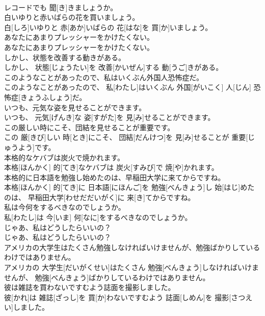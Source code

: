 \documentclass[8pt]{extreport}
\begin{document}
\begin{CJK}{UTF8}{min}
\\	レコードでも 聞[き]きましょうか。	
\\	白いゆりと赤いばらの花を買いましょう。	
\\	白[しろ]いゆりと 赤[あか]いばらの 花[はな]を 買[か]いましょう。	
\\	あなたにあまりプレッシャーをかけたくない。	
\\	あなたにあまりプレッシャーをかけたくない。	
\\	しかし、状態を改善する動きがある。	
\\	しかし、 状態[じょうたい]を 改善[かいぜん]する 動[うご]きがある。	
\\	このようなことがあったので、私はいくぶん外国人恐怖症だ。	
\\	このようなことがあったので、 私[わたし]はいくぶん 外国[がいこく] 人[じん] 恐怖症[きょうふしょう]だ。	
\\	いつも、元気な姿を見せることができます。	
\\	いつも、 元気[げんき]な 姿[すがた]を 見[み]せることができます。	
\\	この厳しい時にこそ、団結を見せることが重要です。	
\\	この 厳[きび]しい 時[とき]にこそ、 団結[だんけつ]を 見[み]せることが 重要[じゅうよう]です。	
\\	本格的なケバブは炭火で焼かれます。	
\\	本格[ほんかく] 的[てき]なケバブは 炭火[すみび]で 焼[や]かれます。	
\\	本格的に日本語を勉強し始めたのは、早稲田大学に来てからですね。	
\\	本格[ほんかく] 的[てき]に 日本語[にほんご]を 勉強[べんきょう]し 始[はじ]めたのは、 早稲田大学[わせだだいがく]に 来[き]てからですね。	
\\	私は今何をするべきなのでしょうか。	
\\	私[わたし]は 今[いま] 何[なに]をするべきなのでしょうか。	
\\	じゃあ、私はどうしたらいいの？	
\\	じゃあ、私はどうしたらいいの？	
\\	アメリカの大学生はたくさん勉強しなければいけませんが、勉強ばかりしているわけではありません。	
\\	アメリカの 大学生[だいがくせい]はたくさん 勉強[べんきょう]しなければいけませんが、 勉強[べんきょう]ばかりしているわけではありません。	
\\	彼は雑誌を買わないですむよう誌面を撮影しました。	
\\	彼[かれ]は 雑誌[ざっし]を 買[か]わないですむよう 誌面[しめん]を 撮影[さつえい]しました。	

\end{CJK}
\end{document}
